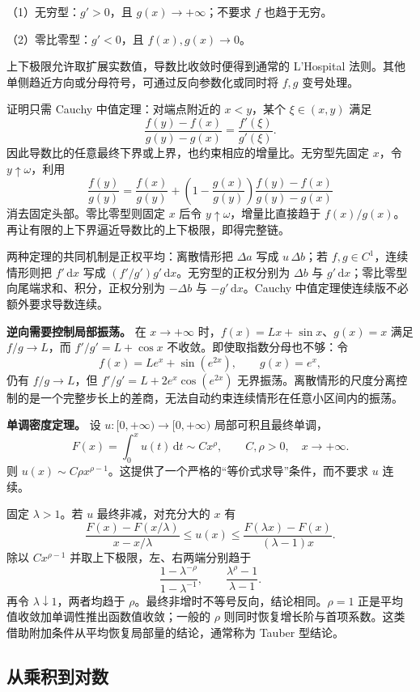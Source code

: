 \documentclass[12pt,fontset=fandol]{ctexart}
\begin{document}
（1）无穷型：$g'>0$，且 $g(x)\to+\infty$；不要求 $f$ 也趋于无穷。

（2）零比零型：$g'<0$，且 $f(x),g(x)\to0$。

上下极限允许取扩展实数值，导数比收敛时便得到通常的 L’Hospital 法则。其他单侧趋近方向或分母符号，可通过反向参数化或同时将 $f,g$ 变号处理。

证明只需 Cauchy 中值定理：对端点附近的 $x<y$，某个 $\xi\in(x,y)$ 满足
\[
\frac{f(y)-f(x)}{g(y)-g(x)}=\frac{f'(\xi)}{g'(\xi)}.
\]
因此导数比的任意最终下界或上界，也约束相应的增量比。无穷型先固定 $x$，令 $y\uparrow\omega$，利用
\[
\frac{f(y)}{g(y)}=
\frac{f(x)}{g(y)}+
\left(1-\frac{g(x)}{g(y)}\right)
\frac{f(y)-f(x)}{g(y)-g(x)}
\]
消去固定头部。零比零型则固定 $x$ 后令 $y\uparrow\omega$，增量比直接趋于 $f(x)/g(x)$。再让有限的上下界逼近导数比的上下极限，即得完整链。

两种定理的共同机制是正权平均：离散情形把 $\Delta a$ 写成 $u\,\Delta b$；若 $f,g\in C^1$，连续情形则把 $f'\,\mathrm dx$ 写成 $(f'/g')g'\,\mathrm dx$。无穷型的正权分别为 $\Delta b$ 与 $g'\,\mathrm dx$；零比零型向尾端求和、积分，正权分别为 $-\Delta b$ 与 $-g'\,\mathrm dx$。Cauchy 中值定理使连续版不必额外要求导数连续。

\textbf{逆向需要控制局部振荡。} 在 $x\to+\infty$ 时，$f(x)=Lx+\sin x$、$g(x)=x$ 满足 $f/g\to L$，而 $f'/g'=L+\cos x$ 不收敛。即使取指数分母也不够：令
\[
f(x)=Le^x+\sin(e^{2x}),\qquad g(x)=e^x,
\]
仍有 $f/g\to L$，但 $f'/g'=L+2e^x\cos(e^{2x})$ 无界振荡。离散情形的尺度分离控制的是一个完整步长上的差商，无法自动约束连续情形在任意小区间内的振荡。

\textbf{单调密度定理。} 设 $u:[0,+\infty)\to[0,+\infty)$ 局部可积且最终单调，
\[
F(x)=\int_0^xu(t)\,\mathrm dt\sim Cx^\rho,
\qquad C,\rho>0,\quad x\to+\infty.
\]
则 $u(x)\sim C\rho x^{\rho-1}$。这提供了一个严格的“等价式求导”条件，而不要求 $u$ 连续。

固定 $\lambda>1$。若 $u$ 最终非减，对充分大的 $x$ 有
\[
\frac{F(x)-F(x/\lambda)}{x-x/\lambda}
\leq u(x)\leq
\frac{F(\lambda x)-F(x)}{(\lambda-1)x}.
\]
除以 $Cx^{\rho-1}$ 并取上下极限，左、右两端分别趋于
\[
\frac{1-\lambda^{-\rho}}{1-\lambda^{-1}},
\qquad
\frac{\lambda^\rho-1}{\lambda-1}.
\]
再令 $\lambda\downarrow1$，两者均趋于 $\rho$。最终非增时不等号反向，结论相同。$\rho=1$ 正是平均值收敛加单调性推出函数值收敛；一般的 $\rho$ 则同时恢复增长阶与首项系数。这类借助附加条件从平均恢复局部量的结论，通常称为 Tauber 型结论。

\subsection{从乘积到对数}
\end{document}
